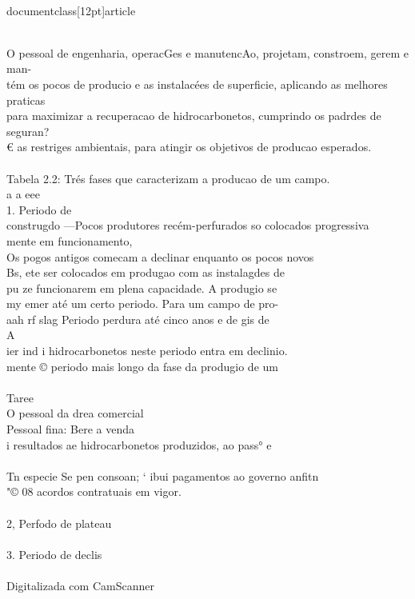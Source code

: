 \\documentclass[12pt]{article}
\begin{document}
\\
O pessoal de engenharia, operacGes e manutencAo, projetam, constroem, gerem e man-\\
tém os pocos de producio e as instalacées de superficie, aplicando as melhores praticas\\
para maximizar a recuperacao de hidrocarbonetos, cumprindo os padrdes de seguran?\\
€ as restriges ambientais, para atingir os objetivos de producao esperados.\\
\\
Tabela 2.2: Trés fases que caracterizam a producao de um campo.\\
a a eee\\
1. Periodo de\\
construgdo —Pocos produtores recém-perfurados so colocados progressiva\\
mente em funcionamento,\\
Os pogos antigos comecam a declinar enquanto os pocos novos\\
Bs, ete ser colocados em produgao com as instalagdes de\\
pu ze funcionarem em plena capacidade. A produgio se\\
my emer até um certo periodo. Para um campo de pro-\\
aah rf slag Periodo perdura até cinco anos e de gis de\\
A\\
ier ind i hidrocarbonetos neste periodo entra em declinio.\\
mente © periodo mais longo da fase da produgio de um\\
\\
Taree\\
O pessoal da drea comercial\\
Pessoal fina: Bere a venda\\
i resultados ae hidrocarbonetos produzidos, ao pass° e\\
\\
Tn especie Se pen consoan; ‘ ibui pagamentos ao governo anfitn\\
"© 08 acordos contratuais em vigor.\\
\\
2, Perfodo de plateau\\
\\
3. Periodo de declis\\
\\
Digitalizada com CamScanner\\
\end{document}
